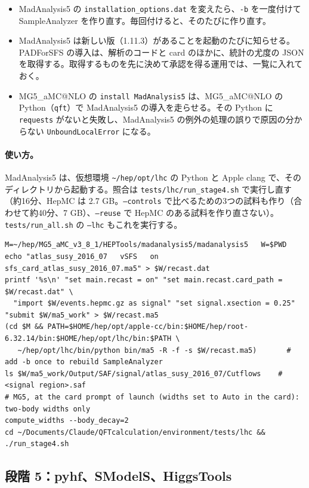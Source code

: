 \documentclass[a4paper,10pt]{ltjsarticle}
\makeatletter
\newcommand{\MGaMC}{MG5\_aMC@NLO}
\newcommand{\pth}[1]{\texttt{\textasciitilde/}\nolinkurl{#1}}
\makeatother
\begin{document}
\begin{itemize}
\item MadAnalysis5 の \texttt{installation\_options.dat} を変えたら、\texttt{-b} を一度付けて SampleAnalyzer を作り直す。毎回付けると、そのたびに作り直す。
\item MadAnalysis5 は新しい版（1.11.3）があることを起動のたびに知らせる。PADForSFS の導入は、解析のコードと card のほかに、統計の尤度の JSON を取得する。取得するものを先に決めて承認を得る運用では、一覧に入れておく。
\item \MGaMC{} の \texttt{install MadAnalysis5} は、\MGaMC{} の Python（\texttt{qft}）で MadAnalysis5 の導入を走らせる。その Python に \texttt{requests} がないと失敗し、MadAnalysis5 の例外の処理の誤りで原因の分からない \texttt{UnboundLocalError} になる。
\end{itemize}

\paragraph{使い方。}MadAnalysis5 は、仮想環境 \pth{hep/opt/lhc} の Python と Apple clang で、そのディレクトリから起動する。照合は \nolinkurl{tests/lhc/run_stage4.sh} で実行し直す（約16分、HepMC は 2.7 GB。\texttt{--controls} で比べるための3つの試料も作り（合わせて約40分、7 GB）、\texttt{--reuse} で HepMC のある試料を作り直さない）。\texttt{tests/run\_all.sh} の \texttt{--lhc} もこれを実行する。
\begin{Verbatim}
M=~/hep/MG5_aMC_v3_8_1/HEPTools/madanalysis5/madanalysis5   W=$PWD
echo "atlas_susy_2016_07   vSFS   on   sfs_card_atlas_susy_2016_07.ma5" > $W/recast.dat
printf '%s\n' "set main.recast = on" "set main.recast.card_path = $W/recast.dat" \
  "import $W/events.hepmc.gz as signal" "set signal.xsection = 0.25" "submit $W/ma5_work" > $W/recast.ma5
(cd $M && PATH=$HOME/hep/opt/apple-cc/bin:$HOME/hep/root-6.32.14/bin:$HOME/hep/opt/lhc/bin:$PATH \
   ~/hep/opt/lhc/bin/python bin/ma5 -R -f -s $W/recast.ma5)       # add -b once to rebuild SampleAnalyzer
ls $W/ma5_work/Output/SAF/signal/atlas_susy_2016_07/Cutflows    # <signal region>.saf
# MG5, at the card prompt of launch (widths set to Auto in the card): two-body widths only
compute_widths --body_decay=2
cd ~/Documents/Claude/QFTcalculation/environment/tests/lhc && ./run_stage4.sh
\end{Verbatim}

\subsection{段階 5：pyhf、SModelS、HiggsTools}\label{sec:lhc5}
\end{document}
